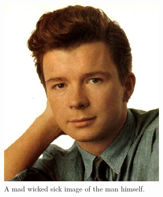\documentclass[11pt]{report}
\begin{document}
\begin{figure}[h!c]
  \includegraphics[totalheight=15cm]{lol}
  \caption{A mad wicked sick image of the man himself.}
\end{figure}
\end{document}
